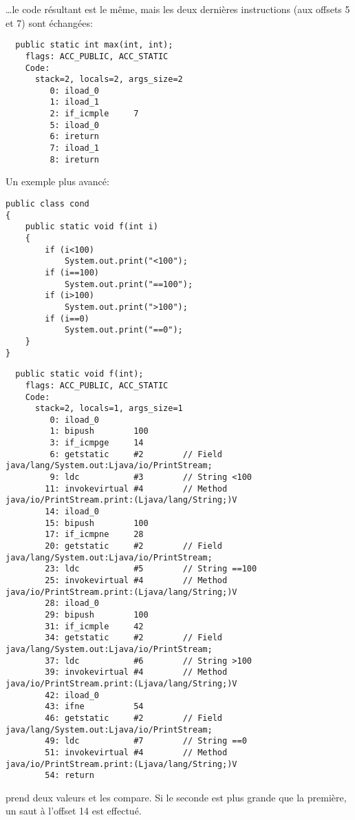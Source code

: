 \dots le code résultant est le même, mais les deux dernières instructions 
(aux offsets 5 et 7) sont échangées:

\begin{lstlisting}
  public static int max(int, int);
    flags: ACC_PUBLIC, ACC_STATIC
    Code:
      stack=2, locals=2, args_size=2
         0: iload_0
         1: iload_1
         2: if_icmple     7
         5: iload_0
         6: ireturn
         7: iload_1
         8: ireturn
\end{lstlisting}

Un exemple plus avancé:

\begin{lstlisting}[style=customjava]
public class cond
{
	public static void f(int i)
	{
		if (i<100)
			System.out.print("<100");
		if (i==100)
			System.out.print("==100");
		if (i>100)
			System.out.print(">100");
		if (i==0)
			System.out.print("==0");
	}
}
\end{lstlisting}

\begin{lstlisting}
  public static void f(int);
    flags: ACC_PUBLIC, ACC_STATIC
    Code:
      stack=2, locals=1, args_size=1
         0: iload_0
         1: bipush        100
         3: if_icmpge     14
         6: getstatic     #2        // Field java/lang/System.out:Ljava/io/PrintStream;
         9: ldc           #3        // String <100
        11: invokevirtual #4        // Method java/io/PrintStream.print:(Ljava/lang/String;)V
        14: iload_0
        15: bipush        100
        17: if_icmpne     28
        20: getstatic     #2        // Field java/lang/System.out:Ljava/io/PrintStream;
        23: ldc           #5        // String ==100
        25: invokevirtual #4        // Method java/io/PrintStream.print:(Ljava/lang/String;)V
        28: iload_0
        29: bipush        100
        31: if_icmple     42
        34: getstatic     #2        // Field java/lang/System.out:Ljava/io/PrintStream;
        37: ldc           #6        // String >100
        39: invokevirtual #4        // Method java/io/PrintStream.print:(Ljava/lang/String;)V
        42: iload_0
        43: ifne          54
        46: getstatic     #2        // Field java/lang/System.out:Ljava/io/PrintStream;
        49: ldc           #7        // String ==0
        51: invokevirtual #4        // Method java/io/PrintStream.print:(Ljava/lang/String;)V
        54: return
\end{lstlisting}

 prend deux valeurs et les compare.
Si le seconde est plus grande que la première, un saut à l'offset 14 est effectué.

